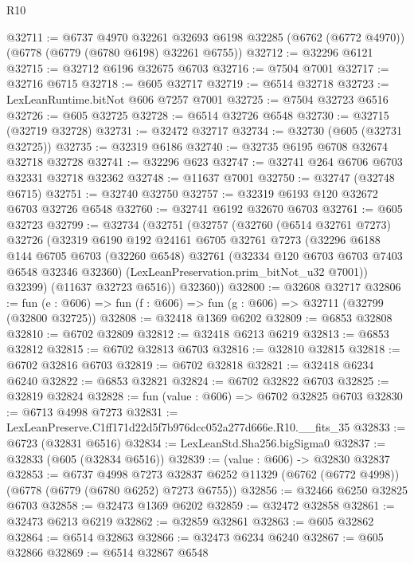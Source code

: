 \begin{lexlean}{R10}
\begin{coremodule}
@32711 := @6737
    @4970
    @32261
    @32693
    @6198
    @32285
    (@6762 (@6772 @4970))
    (@6778 (@6779 (@6780 @6198) @32261 @6755))
@32712 := @32296 @6121
@32715 := @32712 @6196 @32675 @6703
@32716 := @7504 @7001
@32717 := @32716 @6715
@32718 := @605 @32717
@32719 := @6514 @32718
@32723 := LexLeanRuntime.bitNot @606 @7257 @7001
@32725 := @7504 @32723 @6516
@32726 := @605 @32725
@32728 := @6514 @32726 @6548
@32730 := @32715 (@32719 @32728)
@32731 := @32472 @32717
@32734 := @32730 (@605 (@32731 @32725))
@32735 := @32319 @6186
@32740 := @32735 @6195 @6708 @32674 @32718 @32728
@32741 := @32296 @623
@32747 := @32741 @264 @6706 @6703 @32331 @32718 @32362
@32748 := @11637 @7001
@32750 := @32747 (@32748 @6715)
@32751 := @32740 @32750
@32757 := @32319 @6193 @120 @32672 @6703 @32726 @6548
@32760 := @32741 @6192 @32670 @6703
@32761 := @605 @32723
@32799 := @32734
    (@32751
      (@32757
        (@32760
          (@6514 @32761 @7273)
          @32726
          (@32319
            @6190
            @192
            @24161
            @6705
            @32761
            @7273
            (@32296
              @6188
              @144
              @6705
              @6703
              (@32260 @6548)
              @32761
              (@32334 @120 @6703 @6703 @7403 @6548 @32346 @32360)
              (LexLeanPreservation.prim_bitNot_u32 @7001))
            @32399)
          (@11637 @32723 @6516))
        @32360))
@32800 := @32608 @32717
@32806 := fun (e : @606) => fun (f : @606) => fun (g : @606) => @32711 (@32799 (@32800 @32725))
@32808 := @32418 @1369 @6202
@32809 := @6853 @32808
@32810 := @6702 @32809
@32812 := @32418 @6213 @6219
@32813 := @6853 @32812
@32815 := @6702 @32813 @6703
@32816 := @32810 @32815
@32818 := @6702 @32816 @6703
@32819 := @6702 @32818
@32821 := @32418 @6234 @6240
@32822 := @6853 @32821
@32824 := @6702 @32822 @6703
@32825 := @32819 @32824
@32828 := fun (value : @606) => @6702 @32825 @6703
@32830 := @6713 @4998 @7273
@32831 := LexLeanPreserve.C1ff171d22d5f7b976dcc052a277d666e.R10.__fits_35
@32833 := @6723 (@32831 @6516)
@32834 := LexLeanStd.Sha256.bigSigma0
@32837 := @32833 (@605 (@32834 @6516))
@32839 := (value : @606) -> @32830 @32837
@32853 := @6737
    @4998
    @7273
    @32837
    @6252
    @11329
    (@6762 (@6772 @4998))
    (@6778 (@6779 (@6780 @6252) @7273 @6755))
@32856 := @32466 @6250 @32825 @6703
@32858 := @32473 @1369 @6202
@32859 := @32472 @32858
@32861 := @32473 @6213 @6219
@32862 := @32859 @32861
@32863 := @605 @32862
@32864 := @6514 @32863
@32866 := @32473 @6234 @6240
@32867 := @605 @32866
@32869 := @6514 @32867 @6548

\end{coremodule}
\end{lexlean}
